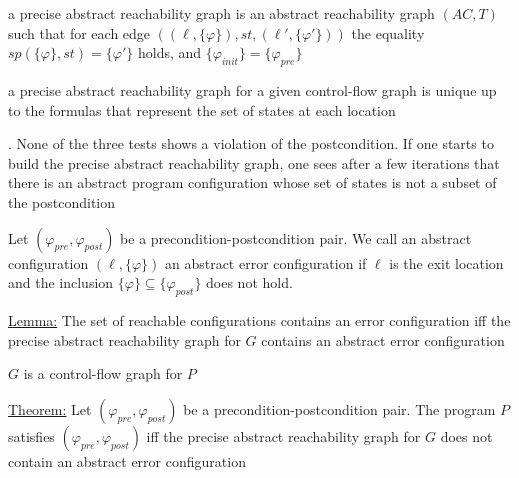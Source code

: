 \documentclass[landscape, a4paper]{article}
\begin{document}
\begin{minipage}[t]{0.2\linewidth}
\begin{betterlist}
\begin{betterlist}
			\begin{betterlist}
				\item {}
			\end{betterlist}
		\end{betterlist}
  \item \color{orange}a \alert{precise abstract reachability graph} is an abstract reachability graph $(AC, T)$ such that for each edge $((\ell, \{\varphi\}), st, (\ell', \{\varphi'\}))$ the equality $sp(\{\varphi\}, st) = \{\varphi'\}$ holds, and $\{\varphi_{init}\} = \{\varphi_{pre}\}$\color{black}
		\begin{betterlist}
			\item a precise abstract reachability graph for a given control-flow graph is unique up to the formulas that represent the set of states at each location
			\item {}. None of the three tests shows a violation of the postcondition. If one starts to build the precise abstract reachability graph, one sees after a few iterations that there is an abstract program configuration whose set of states is not a subset of the postcondition
			\item \script{363}{Algorithm}
			\begin{betterlist}
				\item \script{364}{Modifications}
			\end{betterlist}
		\end{betterlist}
  \item \color{orange}Let $(\varphi_{pre}, \varphi_{post})$ be a precondition-postcondition pair. We call an abstract configuration $(\ell, \{\varphi\})$ an \alert{abstract error configuration} if $\ell$ is the exit location and the inclusion $\{\varphi\} \subseteq \{\varphi_{post}\}$ does not hold. \color{black}
		\item \underline{Lemma:} The set of reachable configurations contains an error configuration \alert{iff} the precise abstract reachability graph for $G$ contains an abstract error configuration
		\begin{betterlist}
			\item $G$ is a control-flow graph for $P$
		\end{betterlist}
		\item \underline{Theorem:} Let $(\varphi_{pre}, \varphi_{post})$ be a precondition-postcondition pair. The program $P$ satisfies $(\varphi_{pre}, \varphi_{post})$ iff the precise abstract reachability graph for $G$ does not contain an abstract error configuration

\end{betterlist}
\end{minipage}
\end{document}
